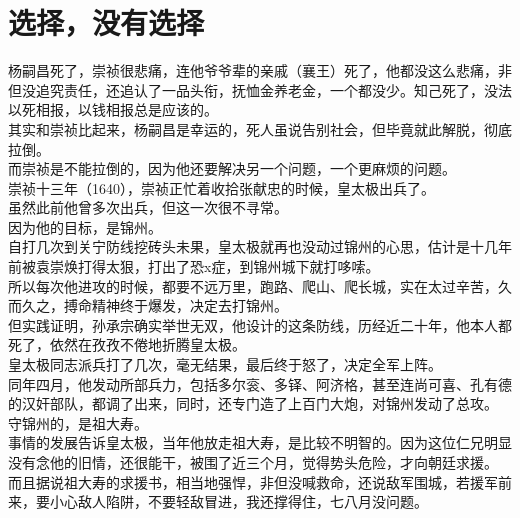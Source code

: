 \section{选择，没有选择}
\ifnum{}
	\begin{multicols}{\theparacolNo}
\fi
杨嗣昌死了，崇祯很悲痛，连他爷爷辈的亲戚（襄王）死了，他都没这么悲痛，非但没追究责任，还追认了一品头衔，抚恤金养老金，一个都没少。知己死了，没法以死相报，以钱相报总是应该的。\\

其实和崇祯比起来，杨嗣昌是幸运的，死人虽说告别社会，但毕竟就此解脱，彻底拉倒。\\

而崇祯是不能拉倒的，因为他还要解决另一个问题，一个更麻烦的问题。\\

崇祯十三年（1640），崇祯正忙着收拾张献忠的时候，皇太极出兵了。\\

虽然此前他曾多次出兵，但这一次很不寻常。\\

因为他的目标，是锦州。\\

自打几次到关宁防线挖砖头未果，皇太极就再也没动过锦州的心思，估计是十几年前被袁崇焕打得太狠，打出了恐x症，到锦州城下就打哆嗦。\\

所以每次他进攻的时候，都要不远万里，跑路、爬山、爬长城，实在太过辛苦，久而久之，搏命精神终于爆发，决定去打锦州。\\

但实践证明，孙承宗确实举世无双，他设计的这条防线，历经近二十年，他本人都死了，依然在孜孜不倦地折腾皇太极。\\

皇太极同志派兵打了几次，毫无结果，最后终于怒了，决定全军上阵。\\

同年四月，他发动所部兵力，包括多尔衮、多铎、阿济格，甚至连尚可喜、孔有德的汉奸部队，都调了出来，同时，还专门造了上百门大炮，对锦州发动了总攻。\\

守锦州的，是祖大寿。\\

事情的发展告诉皇太极，当年他放走祖大寿，是比较不明智的。因为这位仁兄明显没有念他的旧情，还很能干，被围了近三个月，觉得势头危险，才向朝廷求援。\\

而且据说祖大寿的求援书，相当地强悍，非但没喊救命，还说敌军围城，若援军前来，要小心敌人陷阱，不要轻敌冒进，我还撑得住，七八月没问题。\\


\end{multicols}
